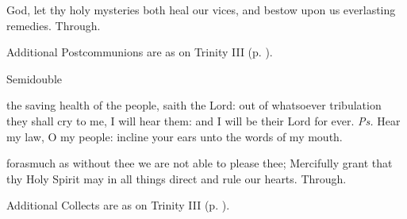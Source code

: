 
\postcommunion
{} God, let thy holy mysteries both heal our vices, and bestow upon us everlasting remedies. Through.
\begin{rubric}
    Additional Postcommunions are as on Trinity III (p. \pageref{TrinityIII}).
\end{rubric}

\begin{inhead}
{Semidouble}
\end{inhead}
\par\noindent
{}


\introit
{} the saving health of the people, saith the Lord: out of whatsoever tribulation they shall cry to me, I will hear them: and I will be their Lord for ever. \textit{Ps.} Hear my law, O my people: incline your ears unto the words of my mouth.

\collect
{} forasmuch as without thee we are not able to please thee; Mercifully grant that thy Holy Spirit may in all things direct and rule our hearts. Through.
\begin{rubric}
    Additional Collects are as on Trinity III (p. \pageref{TrinityIII}).
\end{rubric}

